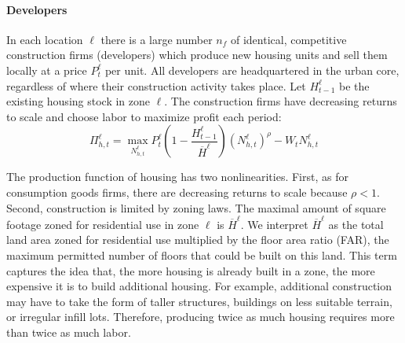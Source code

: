 \documentclass[letterpaper,12pt,dvipsnames,usenames]{article}
\theoremstyle{definition}
\begin{document}
\begin{spacing}{1.25}
\paragraph{Developers} In each location $\ell$ there is a large number $n_{f}$ of identical, competitive construction firms (developers) which produce new housing units and sell them locally at a price $P^{\ell}_{t}$ per unit. All developers are headquartered in the urban core, regardless of where their construction activity takes place.
Let $H^{\ell}_{t-1}$ be the existing housing stock in zone $\ell$. The construction firms have decreasing returns to scale and choose labor to maximize profit each period:
\begin{equation}
\Pi_{h,t}^{\ell}=\max_{N_{h,t}^{\ell}}P_{t}^{\ell}\left(1-\frac{H_{t-1}^{\ell}}{\overline{H}^{\ell}}\right)\left(N_{h,t}^{\ell}\right)^{\rho}-W_{t}
N_{h,t}^{\ell} \label{eq:profith}
\end{equation}

The production function of housing has two nonlinearities. First, as for consumption goods firms, there are decreasing returns to scale because $\rho<1$. Second, construction is limited by zoning laws. The maximal amount of square footage zoned for residential use in zone $\ell$ is  $\overline{H}^{\ell}$. We interpret $\overline{H}^{\ell}$ as the total land area zoned for residential use multiplied by the floor area ratio (FAR), the maximum permitted number of floors that could be built on this land. This term captures the idea that, the more housing is already built in a zone, the more expensive it is to build additional housing. For example, additional construction may have to take the form of taller structures, buildings on less suitable terrain, or irregular infill lots. Therefore, producing twice as much housing requires more than twice as much labor. %


\end{spacing}
\end{document}
